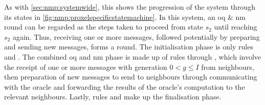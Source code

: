 As with \cref{sec:nmp:systemwide}, this  shows the progression of the system through its states in \cref{fig:nmp:proxelspecificstatemachine}.  In this system, an \gls{oq} \& \gls{nm} round can be regarded as the steps taken to proceed from state \(s_2\) until reaching \(s_2\) again.  Thus, receiving one or more messages, followed potentially by preparing and sending new messages, forms a round.  The initialisation phase is only rules  and .  The combined \gls{oq} and \gls{nm} phase is made up of rules  through , which involve the receipt of one or more messages with generation \(0 < g \leq I\) from neighbours, then preparation of new messages to send to neighbours through communicating with the oracle and forwarding the results of the oracle's computation to the relevant neighbours.  Lastly, rules  and  make up the finalisation phase.

